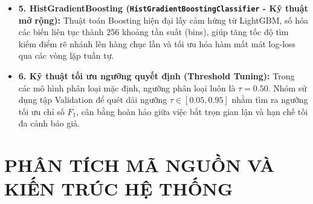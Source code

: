 \documentclass[13pt,a4paper]{extarticle}
\begin{document}
\begin{itemize}
    \begin{equation}
    P(y = 1 \mid x) = \frac{1}{B} \sum_{b=1}^B P_b(y = 1 \mid x)
    \end{equation}
    Thuật toán giúp triệt tiêu phương sai (\textit{variance}) của các cây đơn lẻ, tạo ra ranh giới quyết định cực kỳ mượt mà.
    \item \textbf{5. HistGradientBoosting (\texttt{HistGradientBoostingClassifier} - Kỹ thuật mở rộng):} Thuật toán Boosting hiện đại lấy cảm hứng từ LightGBM, số hóa các biến liên tục thành 256 khoảng tần suất (bins), giúp tăng tốc độ tìm kiếm điểm rẽ nhánh lên hàng chục lần và tối ưu hóa hàm mất mát log-loss qua các vòng lặp tuần tự.
    \item \textbf{6. Kỹ thuật tối ưu ngưỡng quyết định (Threshold Tuning):} Trong các mô hình phân loại mặc định, ngưỡng phân loại luôn là $\tau = 0.50$. Nhóm sử dụng tập Validation để quét dải ngưỡng $\tau \in [0.05, 0.95]$ nhằm tìm ra ngưỡng tối ưu chỉ số $F_1$, cân bằng hoàn hảo giữa việc bắt trọn gian lận và hạn chế tối đa cảnh báo giả.
\end{itemize}

\newpage
\section{PHÂN TÍCH MÃ NGUỒN VÀ KIẾN TRÚC HỆ THỐNG}
\end{document}
